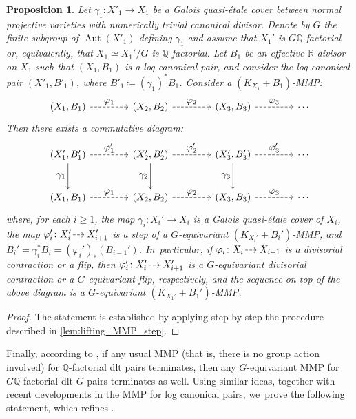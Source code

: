 \documentclass[JEP,XML,SOM,Unicode,published]{cedram}
\let\ts\textstyle
\newcommand{\dradpl}{{\hspace*{-2.5mm}\begin{tikzcd}[ampersand replacement=\&,column sep = scriptsize]\mbox{}\ar[r,dashed]\&\mbox{}\end{tikzcd}\hspace*{-2.5mm}}}
\newcommand{\dratst}{{\hspace*{-2.5mm}\begin{tikzcd}[ampersand replacement=\&,column sep = small]\mbox{}\ar[r,dashed]\&\mbox{}\end{tikzcd}\hspace*{-2mm}}}
\let\drascst\dratst
\newcommand{\dra}{\mathchoice{\dradpl}{\dratst}{\drascst}{\drascst}}
\theoremstyle{plain}
\newtheorem{prop}[thm]{Proposition}
\theoremstyle{definition}
\newcommand{\Q}{\mathbb{Q}}
\newcommand{\R}{\mathbb{R}}
\DeclareMathOperator{\Aut}{Aut}
\begin{document}
\begin{prop}
\label{prop:lifting_MMP}
Let $\gamma_1\colon X'_1\to X_1$ be a Galois quasi-étale cover between normal projective varieties with numerically trivial canonical divisor. Denote by $G$ the finite subgroup of $\Aut(X'_1)$ defining $\gamma_1$ and assume that $X_1'$ is $G\Q$-factorial or, equivalently, that $X_1 \simeq X_1' /G$ is $\Q$\nobreakdash-factorial. Let $B_1$ be an effective $\R$\nobreakdash-divisor on $X_1$ such that $(X_1, B_1)$ is a log canonical pair, and consider the log canonical pair $(X'_1,B'_1)$, where $B'_1 \coloneqq (\gamma_1)^* B_1$. Consider a $(K_{X_1}+B_1)$-MMP:
\[
\begin{tikzcd}[column sep = 2em]
(X_1,B_1) \arrow[rr, dashed, "\ts \varphi_1"] && (X_2,B_2) \arrow[rr, dashed, "\ts \varphi_2"] && (X_3,B_3) \arrow[rr, dashed, "\ts \varphi_3"] && \cdots
\end{tikzcd}
\]
Then there exists a commutative diagram:
\[
\begin{tikzcd}[column sep = 2em, row sep = large]
(X_1',B_1') \arrow[d, "\ts \gamma_1" swap] \arrow[rr, dashed, "\ts \varphi'_1"] && (X_2',B_2') \arrow[d, "\ts \gamma_2" swap] \arrow[rr, dashed, "\ts \varphi'_2"] && (X_3',B_3') \arrow[d, "\ts \gamma_3" swap] \arrow[rr, dashed, "\ts \varphi'_3"] && \cdots
\\
(X_1,B_1) \arrow[rr, dashed, "\ts \varphi_1"] && (X_2,B_2) \arrow[rr, dashed, "\ts \varphi_2"] && (X_3,B_3) \arrow[rr, dashed, "\ts \varphi_3"] && \cdots
\end{tikzcd}
\]
where, for each $i\geq 1$, the map $\gamma_i \colon X_i' \to X_i$ is a Galois quasi-étale cover of $X_i$, the map $\varphi'_i \colon X_i'\dra X_{i+1}'$ is a step of a $G$\nobreakdash-equivariant $(K_{X_i'}+B_i')$-MMP, and $B_i' = \gamma_i^* B_i = (\varphi_i')_* (B_{i-1}')$. In~particular, if $\varphi_i \colon X_i \dra X_{i+1}$ is a divisorial contraction or a flip, then $\varphi'_i \colon X_i'\dra X_{i+1}'$ is a $G$\nobreakdash-equivariant divisorial contraction or a $G$\nobreakdash-equivariant flip, respectively, and the sequence on top of the above diagram is a $G$\nobreakdash-equivariant $(K_{X_1'} + B_1')$-MMP.
\end{prop}

\begin{proof}
The statement is established by applying step by step the procedure described in \autoref{lem:lifting_MMP_step}.
\end{proof}

Finally, according to \cite[Prop.\,4.2.2]{Pro21}, if any usual MMP (that is, there is no group action involved) for $\Q$\nobreakdash-factorial dlt pairs terminates, then any $G$\nobreakdash-equivariant MMP for $G\Q$-factorial dlt $G$\nobreakdash-pairs terminates as well. Using similar ideas, together with recent developments in the MMP for log canonical pairs, we~prove the following statement, which refines \cite[Prop.\,4.2.2]{Pro21}.
\end{document}
